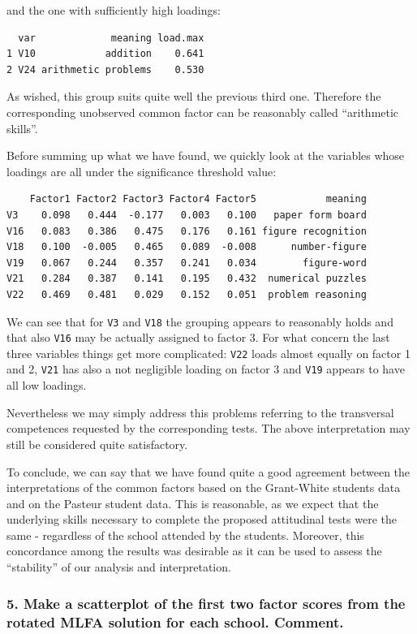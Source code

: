 \documentclass[
  letterpaper,
  DIV=11,
  numbers=noendperiod]{scrartcl}
\begin{document}
and the one with sufficiently high loadings:

\begin{verbatim}
  var             meaning load.max
1 V10            addition    0.641
2 V24 arithmetic problems    0.530
\end{verbatim}

As wished, this group suits quite well the previous third one. Therefore
the corresponding unobserved common factor can be reasonably called
``arithmetic skills''.

Before summing up what we have found, we quickly look at the variables
whose loadings are all under the significance threshold value:

\begin{verbatim}
    Factor1 Factor2 Factor3 Factor4 Factor5            meaning
V3    0.098   0.444  -0.177   0.003   0.100   paper form board
V16   0.083   0.386   0.475   0.176   0.161 figure recognition
V18   0.100  -0.005   0.465   0.089  -0.008      number-figure
V19   0.067   0.244   0.357   0.241   0.034        figure-word
V21   0.284   0.387   0.141   0.195   0.432  numerical puzzles
V22   0.469   0.481   0.029   0.152   0.051  problem reasoning
\end{verbatim}

We can see that for \texttt{V3} and \texttt{V18} the grouping appears to
reasonably holds and that also \texttt{V16} may be actually assigned to
factor 3. For what concern the last three variables things get more
complicated: \texttt{V22} loads almost equally on factor 1 and 2,
\texttt{V21} has also a not negligible loading on factor 3 and
\texttt{V19} appears to have all low loadings.

Nevertheless we may simply address this problems referring to the
transversal competences requested by the corresponding tests. The above
interpretation may still be considered quite satisfactory.

To conclude, we can say that we have found quite a good agreement
between the interpretations of the common factors based on the
Grant-White students data and on the Pasteur student data. This is
reasonable, as we expect that the underlying skills necessary to
complete the proposed attitudinal tests were the same - regardless of
the school attended by the students. Moreover, this concordance among
the results was desirable as it can be used to assess the ``stability''
of our analysis and interpretation.

\hypertarget{make-a-scatterplot-of-the-first-two-factor-scores-from-the-rotated-mlfa-solution-for-each-school.-comment.}{%
\subsubsection{5. Make a scatterplot of the first two factor scores from
the rotated MLFA solution for each school.
Comment.}\label{make-a-scatterplot-of-the-first-two-factor-scores-from-the-rotated-mlfa-solution-for-each-school.-comment.}}
\end{document}
